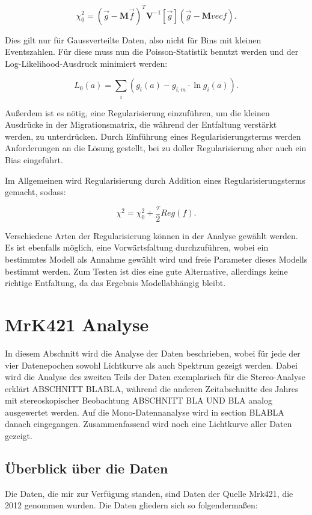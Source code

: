 \begin{equation}
 \chi_0^2=(\vec{g}-\mathbf{M}\vec{f})^T \mathbf{V}^{-1}[\vec{g}](\vec{g}-\mathbf{M}vec{f}).
\end{equation}

Dies gilt nur für Gaussverteilte Daten, also nicht für Bins mit kleinen Eventszahlen.
Für diese muss nun die Poisson-Statistik benutzt werden und der Log-Likelihood-Ausdruck minimiert werden:

\begin{equation}
 L_0(a)=\sum_i (g_i(a)-g_{i,m}\cdot \ln g_i(a)).
\end{equation}

Außerdem ist es nötig, eine Regularisierung einzuführen, um die kleinen Ausdrücke in der Migrationsmatrix, die während der Entfaltung verstärkt werden, zu unterdrücken.
Durch Einführung eines Regularisierungsterms werden Anforderungen an die Lösung gestellt, bei zu doller Regularisierung aber auch ein Bias eingeführt.

Im Allgemeinen wird Regularisierung durch Addition eines Regularisierungsterms gemacht, sodass:

\begin{equation}
 \chi^2=\chi_0^2 +\frac{\tau}{2} Reg(f).
\end{equation}

Verschiedene Arten der Regularisierung können in der Analyse gewählt werden.
Es ist ebenfalls möglich, eine Vorwärtsfaltung durchzuführen, wobei ein bestimmtes Modell als Annahme gewählt wird und freie Parameter dieses Modells bestimmt werden.
Zum Testen ist dies eine gute Alternative, allerdings keine richtige Entfaltung, da das Ergebnis Modellabhängig bleibt.

\section{MrK421 Analyse}
In diesem Abschnitt wird die Analyse der Daten beschrieben, wobei für jede der vier Datenepochen sowohl Lichtkurve als auch Spektrum gezeigt werden.
Dabei wird die Analyse des zweiten Teils der Daten exemplarisch für die Stereo-Analyse erklärt ABSCHNITT BLABLA, während die anderen Zeitabschnitte des Jahres mit stereoskopischer Beobachtung ABSCHNITT BLA UND BLA analog ausgewertet werden.
Auf die Mono-Datennanalyse wird in section BLABLA danach eingegangen.
Zusammenfassend wird noch eine Lichtkurve aller Daten gezeigt.


\subsection{Überblick über die Daten}
Die Daten, die mir zur Verfügung standen, sind Daten der Quelle Mrk421, die 2012 genommen wurden.
Die Daten gliedern sich so folgendermaßen:

